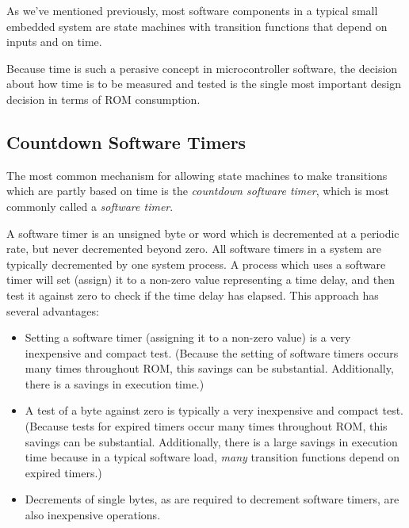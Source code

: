 As we've mentioned previously, most software components in a
typical small embedded system are state machines with transition
functions that depend on inputs and on time.

Because time is such a perasive concept in microcontroller software,
the decision about how time is to be measured and tested is the
single most important design decision in terms of ROM consumption.


\subsection{Countdown Software Timers}
\label{cpco0:smot0:scst0}

The most common mechanism for allowing state machines to make transitions
which are partly based on time is the 
\emph{countdown software timer},
which is most commonly called a 
\emph{software timer}.

A software timer is an unsigned byte or word which is decremented at a 
periodic rate, but never decremented beyond zero.  All software 
timers in a system are typically decremented by one system process.
A process which uses a software timer will set (assign) it to
a non-zero value representing a time delay, and then test it against 
zero to check if the time delay has elapsed.  This approach has
several advantages:

\begin{itemize}
\item Setting a software timer (assigning it to a non-zero
      value) is a very inexpensive and compact test.  (Because
      the setting of software timers occurs many times throughout
      ROM, this savings can be substantial.  Additionally,
      there is a savings in execution time.)
\item A test of a byte against zero is typically a very 
      inexpensive and compact test.  (Because tests for
      expired timers occur many times throughout ROM,
      this savings can be substantial.  Additionally, there
      is a large savings in execution time because 
      in a typical software load, \emph{many} transition
      functions depend on expired timers.)
\item Decrements of single bytes, as are required
      to decrement software timers, are also inexpensive operations.
\end{itemize}


